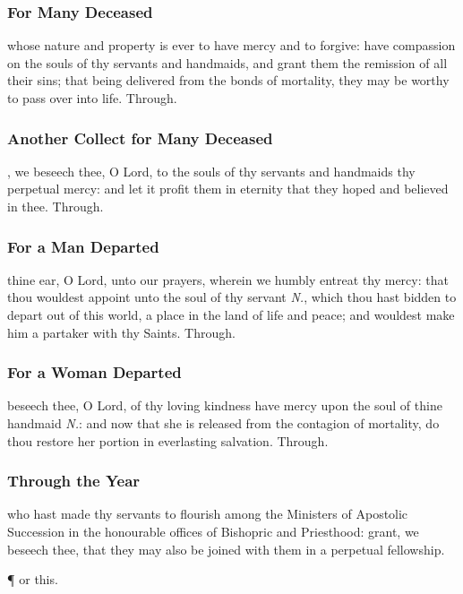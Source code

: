 \subsubsection{For Many Deceased}
 whose nature and property is ever to have mercy and to forgive: have compassion on the souls of thy servants and handmaids, and grant them the remission of all their sins; that being delivered from the bonds of mortality, they may be worthy to pass over into life. Through.

\subsubsection{Another Collect for Many Deceased}
, we beseech thee, O Lord, to the souls of thy servants and handmaids thy perpetual mercy: and let it profit them in eternity that they hoped and believed in thee. Through.

\subsubsection{For a Man Departed}
 thine ear, O Lord, unto our prayers, wherein we humbly entreat thy mercy: that thou wouldest appoint unto the soul of thy servant \textit{N.}, which thou hast bidden to depart out of this world, a place in the land of life and peace; and wouldest make him a partaker with thy Saints. Through.

\subsubsection{For a Woman Departed}
 beseech thee, O Lord, of thy loving kindness have mercy upon the soul of thine handmaid \textit{N.}: and now that she is released from the contagion of mortality, do thou restore her portion in everlasting salvation. Through.

\subsubsection{Through the Year}
 who hast made thy servants to flourish among the Ministers of Apostolic Succession in the honourable offices of Bishopric and Priesthood: grant, we beseech thee, that they may also be joined with them in a perpetual fellowship.

\begin{inhead}
	\P{ }or this.
\end{inhead}


